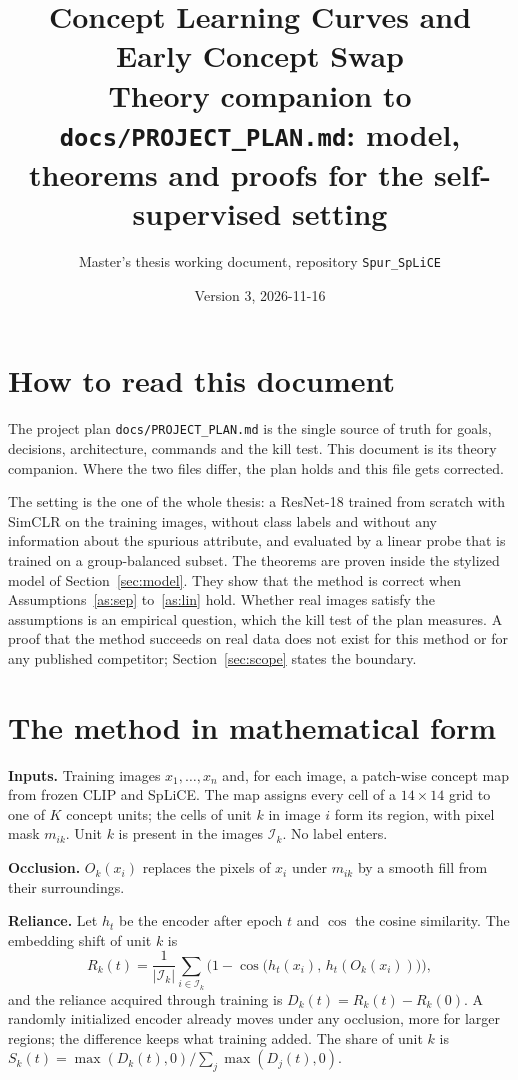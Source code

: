 \documentclass[11pt]{article}
\title{Concept Learning Curves and Early Concept Swap\\[2pt]
\large Theory companion to \texttt{docs/PROJECT\_PLAN.md}: model, theorems and proofs for the self-supervised setting}
\author{Master's thesis working document, repository \texttt{Spur\_SpLiCE}}
\date{Version 3, 2026-11-16}
\theoremstyle{definition}
\theoremstyle{remark}
\begin{document}
\maketitle

\section*{How to read this document}

The project plan \texttt{docs/PROJECT\_PLAN.md} is the single source of truth for goals, decisions, architecture,
commands and the kill test. This document is its theory companion. Where the two files differ, the plan holds and this
file gets corrected.

The setting is the one of the whole thesis: a ResNet-18 trained from scratch with SimCLR on the training images,
without class labels and without any information about the spurious attribute, and evaluated by a linear probe that
is trained on a group-balanced subset. The theorems are proven inside the stylized model of
Section~\ref{sec:model}. They show that the method is correct when Assumptions~\ref{as:sep} to~\ref{as:lin} hold.
Whether real images satisfy the assumptions is an empirical question, which the kill test of the plan measures. A
proof that the method succeeds on real data does not exist for this method or for any published competitor;
Section~\ref{sec:scope} states the boundary.

\section{The method in mathematical form}\label{sec:method}

\textbf{Inputs.} Training images $x_1,\dots,x_n$ and, for each image, a patch-wise concept map from frozen CLIP and
SpLiCE. The map assigns every cell of a $14\times14$ grid to one of $K$ concept units; the cells of unit $k$ in image
$i$ form its region, with pixel mask $m_{ik}$. Unit $k$ is present in the images $\mathcal{I}_k$. No label enters.

\textbf{Occlusion.} $O_k(x_i)$ replaces the pixels of $x_i$ under $m_{ik}$ by a smooth fill from their surroundings.

\textbf{Reliance.} Let $h_t$ be the encoder after epoch $t$ and $\cos$ the cosine similarity. The embedding shift of
unit $k$ is
\begin{equation}\label{eq:shift}
R_k(t)=\frac{1}{|\mathcal{I}_k|}\sum_{i\in\mathcal{I}_k}\Big(1-\cos\big(h_t(x_i),\,h_t(O_k(x_i))\big)\Big),
\end{equation}
and the reliance acquired through training is $D_k(t)=R_k(t)-R_k(0)$. A randomly initialized encoder already moves
under any occlusion, more for larger regions; the difference keeps what training added. The share of unit $k$ is
$S_k(t)=\max(D_k(t),0)/\sum_j\max(D_j(t),0)$.
\end{document}

